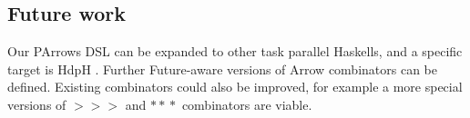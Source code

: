\documentclass{jfp1}
\renewcommand{\cite}[1]{\citep{#1}}
\newcommand{\comm}[2]{}
\newcommand{\olcomment}[1]{\comm{OL}{#1}}
\newcommand{\mbcomment}[1]{\comm{MB}{#1}}
\begin{document}


\subsection{Future work}
\label{sec:future-work}

Our PArrows DSL can be expanded %
to other task parallel Haskells, and a specific target is HdpH \cite{Maier:2014:HDS:2775050.2633363}.
Further Future-aware versions of Arrow combinators can be defined. Existing combinators could also be improved, for example a more special versions of \ensuremath{\mathbin{>\!\!>\!\!>}} and \ensuremath{\mathbin{*\!*\!*}} combinators are viable.
\end{document}
